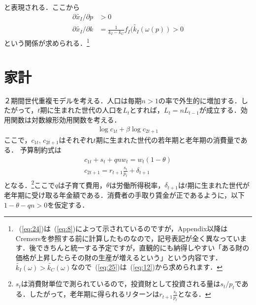 \documentclass[12pt,a4paper]{jsarticle}
\begin{document}
と表現される．ここから
\begin{align}
  \partial \tilde{x_{I}}/ \partial p &>0 \label{eq:24}\\
\partial \tilde{x_{I}}/ \partial k &= \frac{1}{k_{I}-k_{C}} f_{I}(\tilde{k_{I}}(\omega(p))>0 \label{eq:25}
\end{align}
という関係が求められる．\footnote{~(\ref{eq:24})は~(\ref{eq:8})によって示されているのですが，Appendix以降はCremersを参照する前に計算したものなので，記号表記が全く異なっています．後できちんと統一する予定ですが，直観的にも納得しやすい「ある財の価格が上昇したらその財の生産が増えるという」という内容です．$\tilde{k_{I}}(\omega) > \tilde{k_{C}}(\omega)$なので~(\ref{eq:25})は~(\ref{eq:12})から求められます．}








\section{家計}
２期間世代重複モデルを考える．人口は毎期$n>1$の率で外生的に増加する．したがって，$t$期に生まれた世代の人口を$L_{t}$とすれば，$L_{t} = nL_{t-1}$が成立する．効用関数は対数線形効用関数を考える．
\begin{align}
 \log c_{1t} + \beta \log c_{2 t+1}
\end{align}
ここで，$c_{1 t}, \, c_{2 t+1}$はそれぞれ$t$期に生まれた世代の若年期と老年期の消費量である．
予算制約式は
\begin{align}
 c_{1 t} + s_{t} +qnw_{t} = w_{t}(1-\theta) \\
c_{2 t+1} = r_{t+1}\frac{s_{t}}{p_{t}} + \delta_{t+1} 
\end{align}
となる．\footnote{$s_{t}$は消費財単位で測られているので，投資財として投資される量は$s_{t}/p_{t}$である．したがって，老年期に得られるリターンは$r_{t+1}\frac{s_{t}}{p_{t}}$となる．}ここで$q$は子育て費用，$\theta$は労働所得税率，$\delta_{t+1}$は$t$期に生まれた世代が老年期に受け取る年金額である．消費者の手取り賃金が正であるように，以下$1-\theta-qn>0$を仮定する．
\end{document}
